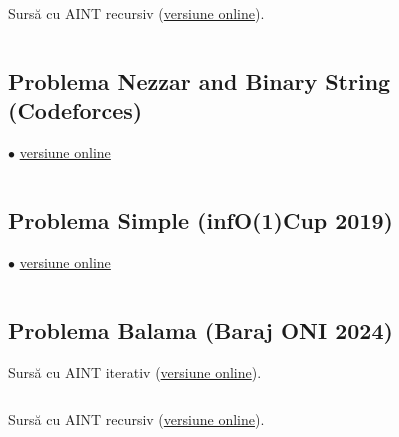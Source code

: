 \inputminted{cpp}{src/segment-trees/polynomial-queries-iter.cpp}

Sursă cu AINT recursiv (\href{https://github.com/CatalinFrancu/nerdvana/blob/main/problems/cses/1736-polynomial-queries/segtree-v2.cpp}{versiune online}).

\inputminted{cpp}{src/segment-trees/polynomial-queries-rec.cpp}

\subsection{Problema Nezzar and Binary String (Codeforces)}
\label{code:nezzar-and-binary-string}
$\bullet$
\href{https://codeforces.com/contest/1478/submission/283167039}{versiune online}

\inputminted{cpp}{src/segment-trees/nezzar-and-binary-string.cpp}

\subsection{Problema Simple (infO(1)Cup 2019)}
\label{code:simple}
$\bullet$
\href{https://kilonova.ro/submissions/802142}{versiune online}

\inputminted{cpp}{src/segment-trees/simple.cpp}

\subsection{Problema Balama (Baraj ONI 2024)}
\label{code:balama}

Sursă cu AINT iterativ (\href{https://kilonova.ro/submissions/800609}{versiune online}).

\inputminted{cpp}{src/segment-trees/balama-iter.cpp}

Sursă cu AINT recursiv (\href{https://kilonova.ro/submissions/367617}{versiune online}).

\inputminted{cpp}{src/segment-trees/balama-rec.cpp}
